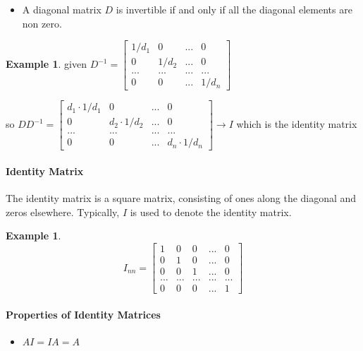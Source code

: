 \documentclass{article}
\theoremstyle{definition}
\newtheorem{example}[theorem]{Example}
\theoremstyle{remark}
\begin{document}
\begin{itemize}
    \item A diagonal matrix $D$ is invertible if and only if all the diagonal elements are non zero.
\end{itemize}

\begin{example}
    given $D^{-1} = \begin{bmatrix}
        1/d_1 & 0 & ... & 0 \\
        0 & 1/d_2 & ... & 0 \\
        ... & ... & ... & ... \\
        0 & 0 & ... & 1/d_n 
    \end{bmatrix}$

    so $DD^{-1} = \begin{bmatrix}
        d_1 \cdot 1/d_1 & 0 & ... & 0 \\
        0 & d_2 \cdot 1/d_2 & ... & 0 \\
        ... & ... & ... & ... \\
        0 & 0 & ... & d_n \cdot 1/d_n
    \end{bmatrix} \rightarrow I $ which is the identity matrix  
\end{example}

\paragraph{Identity Matrix}
The identity matrix is a square matrix, consisting of ones along the diagonal and zeros elsewhere. Typically, $I$ is used to denote the identity matrix. 

\begin{example}
    $$I_{nn} = \begin{bmatrix}
        1 & 0 & 0 & ... & 0 \\
        0 & 1 & 0 & ... & 0 \\
        0 & 0 & 1 & ... & 0 \\
        ... & ... & ... & ... & ... \\
        0 & 0 & 0 & ... & 1
    \end{bmatrix}$$
\end{example}

\paragraph{Properties of Identity Matrices}
\begin{itemize}
    \item $AI = IA = A$
\end{itemize}
\end{document}
